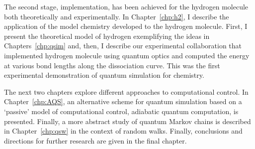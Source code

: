 \documentclass[11pt,oneside,final]{huthesis}%
\begin{document}
The second stage, implementation, has been achieved for the hydrogen molecule both theoretically and experimentally.  In Chapter~\ref{chp:h2}, I describe the application of the model chemistry developed to the hydrogen molecule.  First, I present the theoretical model of hydrogen exemplifying the ideas in Chapters~\ref{chp:qsim} and, then, I describe our experimental collaboration that implemented hydrogen molecule using quantum optics and computed the energy at various bond lengths along the dissociation curve.  This was the first experimental demonstration of quantum simulation for chemistry. 

The next two chapters explore different approaches to computational control.  In Chapter~\ref{chp:AQS}, an alternative scheme for quantum simulation based on a `passive' model of computational control, adiabatic quantum computation, is presented.  Finally, a more abstract study of quantum Markov chains is described in Chapter~\ref{chp:qsw} in the context of random walks.  Finally, conclusions and directions for further research are given in the final chapter.






%




\end{document}

